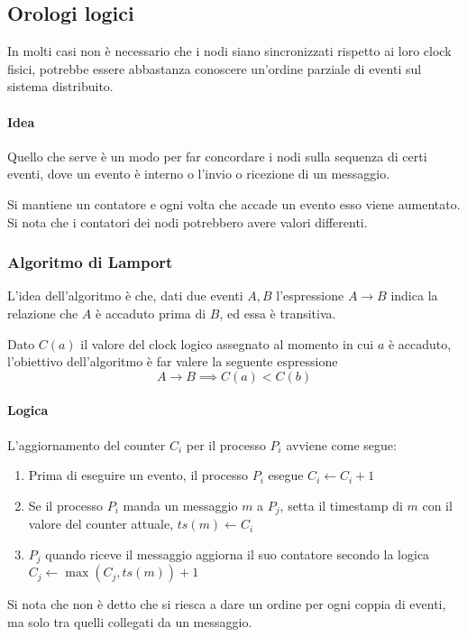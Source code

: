 \subsection{Orologi logici}

In molti casi non è necessario che i nodi siano sincronizzati 
rispetto ai loro clock fisici, potrebbe essere abbastanza 
conoscere un'ordine parziale di eventi sul sistema distribuito.

\paragraph{Idea}
Quello che serve è un modo per far concordare i nodi sulla
sequenza di certi eventi, dove un evento 
è interno o l'invio o ricezione di un messaggio. 

Si mantiene un contatore e ogni volta che accade un evento 
esso viene aumentato. Si nota che i contatori 
dei nodi potrebbero avere valori differenti.

\subsubsection{Algoritmo di Lamport}

L'idea dell'algoritmo è che, dati due eventi 
$A, B$ l'espressione $A \rightarrow B$ indica la relazione 
che $A$ è accaduto prima di $B$, ed essa è transitiva.

Dato $C(a)$ il valore del clock logico assegnato 
al momento in cui $a$ è accaduto, l'obiettivo dell'algoritmo 
è far valere la seguente espressione
$$A \rightarrow B \implies C(a) < C(b)$$

\paragraph{Logica}
L'aggiornamento del counter $C_i$ per il 
processo $P_i$ avviene come segue: 
\begin{enumerate}
    \item Prima di eseguire un evento, il processo $P_i$ 
    esegue $C_i \gets C_i + 1$
    \item Se il processo $P_i$ manda un messaggio $m$ a $P_j$, 
    setta il timestamp di $m$ con il valore del counter attuale, 
    $ts(m) \gets C_i$
    \item $P_j$ quando riceve il messaggio aggiorna il suo 
    contatore secondo la logica $C_j \gets \max(C_j, ts(m)) + 1$
\end{enumerate}
Si nota che non è detto che si riesca a dare un ordine per ogni 
coppia di eventi, ma solo tra quelli collegati da un messaggio.

